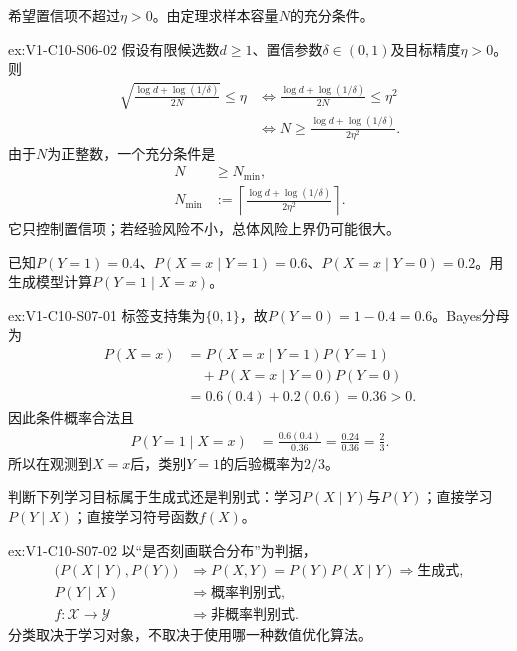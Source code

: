\begin{SLChapterExercisePairSection}
\begin{exercise}\label{ex:V1-C10-S06-02}
希望置信项不超过$\eta>0$。由定理求样本容量$N$的充分条件。
\end{exercise}
\label{sol:V1-C10-S06-02}
\begin{chapterexercisesolution}{ex:V1-C10-S06-02}
假设有限候选数$d\ge1$、置信参数$\delta\in(0,1)$及目标精度$\eta>0$。则
\[
\begin{aligned}
\sqrt{\frac{\log d+\log(1/\delta)}{2N}}\le\eta
&\Longleftrightarrow
\frac{\log d+\log(1/\delta)}{2N}\le\eta^2\\
&\Longleftrightarrow
N\ge\frac{\log d+\log(1/\delta)}{2\eta^2}.
\end{aligned}
\]
由于$N$为正整数，一个充分条件是
\[
\begin{aligned}
N&\ge N_{\min},\\
N_{\min}&:=
\left\lceil\frac{\log d+\log(1/\delta)}{2\eta^2}\right\rceil.
\end{aligned}
\]
它只控制置信项；若经验风险不小，总体风险上界仍可能很大。
\end{chapterexercisesolution}

\begin{exercise}\label{ex:V1-C10-S07-01}
已知$P(Y=1)=0.4$、$P(X=x\mid Y=1)=0.6$、$P(X=x\mid Y=0)=0.2$。用生成模型计算$P(Y=1\mid X=x)$。
\end{exercise}
\label{sol:V1-C10-S07-01}
\begin{chapterexercisesolution}{ex:V1-C10-S07-01}
标签支持集为$\{0,1\}$，故$P(Y=0)=1-0.4=0.6$。Bayes分母为
\[
\begin{aligned}
P(X=x)
  &=P(X=x\mid Y=1)P(Y=1)\\
  &\quad+P(X=x\mid Y=0)P(Y=0)\\
  &=0.6(0.4)+0.2(0.6)=0.36>0.
\end{aligned}
\]
因此条件概率合法且
\[
\begin{aligned}
P(Y=1\mid X=x)
  &=\frac{0.6(0.4)}{0.36}
    =\frac{0.24}{0.36}=\frac23.
\end{aligned}
\]
所以在观测到$X=x$后，类别$Y=1$的后验概率为$2/3$。
\end{chapterexercisesolution}

\begin{exercise}\label{ex:V1-C10-S07-02}
判断下列学习目标属于生成式还是判别式：学习$P(X\mid Y)$与$P(Y)$；直接学习$P(Y\mid X)$；直接学习符号函数$f(X)$。
\end{exercise}
\label{sol:V1-C10-S07-02}
\begin{chapterexercisesolution}{ex:V1-C10-S07-02}
以“是否刻画联合分布”为判据，
\[
\begin{aligned}
\bigl(P(X\mid Y),P(Y)\bigr)
  &\Longrightarrow P(X,Y)=P(Y)P(X\mid Y)
    \Longrightarrow \text{生成式},\\
P(Y\mid X)
  &\Longrightarrow \text{概率判别式},\\
f:\mathcal X\to\mathcal Y
  &\Longrightarrow \text{非概率判别式}.
\end{aligned}
\]
分类取决于学习对象，不取决于使用哪一种数值优化算法。
\end{chapterexercisesolution}


\end{SLChapterExercisePairSection}
